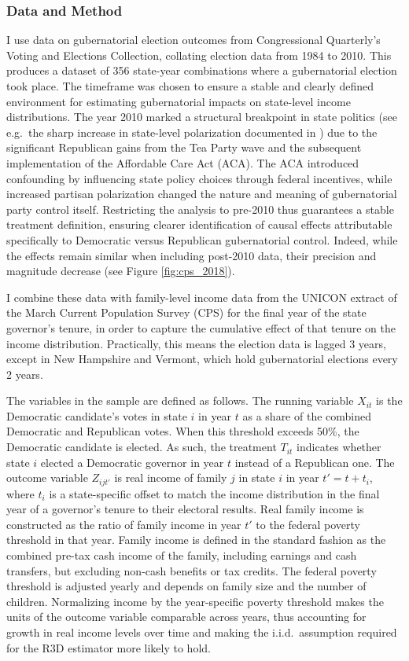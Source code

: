\documentclass[12pt]{article}
\begin{document}
\subsubsection{Data and Method}

I use data on gubernatorial election outcomes from Congressional Quarterly's Voting and Elections Collection, collating election data from 1984 to 2010. This produces a dataset of 356 state-year combinations where a gubernatorial election took place. The timeframe was chosen to ensure a stable and clearly defined environment for estimating gubernatorial impacts on state-level income distributions. The year 2010 marked a structural breakpoint in state politics (see e.g.\ the sharp increase in state-level polarization documented in \citet{shor2022two}) due to the significant Republican gains from the Tea Party wave and the subsequent implementation of the Affordable Care Act (ACA). The ACA introduced confounding by influencing state policy choices through federal incentives, while increased partisan polarization changed the nature and meaning of gubernatorial party control itself. Restricting the analysis to pre-2010 thus guarantees a stable treatment definition, ensuring clearer identification of causal effects attributable specifically to Democratic versus Republican gubernatorial control. Indeed, while the effects remain similar when including post-2010 data, their precision and magnitude decrease (see Figure \ref{fig:cps_2018}). 


I combine these data with family-level income data from the UNICON extract of the March Current Population Survey (CPS) for the final year of the state governor's tenure, in order to capture the cumulative effect of that tenure on the income distribution. Practically, this means the election data is lagged 3 years, except in New Hampshire and Vermont, which hold gubernatorial elections every 2 years. 

The variables in the sample are defined as follows. The running variable $X_{it}$ is the Democratic candidate's votes in state $i$ in year $t$ as a share of the combined Democratic and Republican votes. When this threshold exceeds 50\%, the Democratic candidate is elected. As such, the treatment $T_{it}$ indicates whether state $i$ elected a Democratic governor in year $t$ instead of a Republican one. The outcome variable $Z_{ijt'}$ is real income of family $j$ in state $i$ in year $t'=t+t_i$, where $t_i$ is a state-specific offset to match the income distribution in the final year of a governor's tenure to their electoral results. Real family income is constructed as the ratio of family income in year $t'$ to the federal poverty threshold in that year. Family income is defined in the standard fashion as the combined pre-tax cash income of the family, including earnings and cash transfers, but excluding non-cash benefits or tax credits. The federal poverty threshold is adjusted yearly and depends on family size and the number of children. Normalizing income by the year-specific poverty threshold makes the units of the outcome variable comparable across years, thus accounting for growth in real income levels over time and making the i.i.d.\ assumption required for the R3D estimator more likely to hold. 
\end{document}
